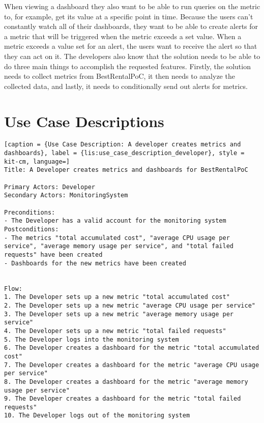 When viewing a dashboard they also want to be able to run queries on the metric to, for example, get
its value at a specific point in time.
Because the users can't constantly watch all of their dashboards, they want to be able to create
alerts for a metric that will be triggered when the metric exceeds a set value.
When a metric exceeds a value set for an alert, the users want to receive the alert so that they can act on it.
The developers also know that the solution needs to be able to do three main things to accomplish
the requested features.
Firstly, the solution needs to collect metrics from BestRentalPoC,
it then needs to analyze the collected data, and lastly, it needs to conditionally send out alerts
for metrics.

\section{Use Case Descriptions}


\vspace{0.5cm}
\begin{lstlisting}[caption = {Use Case Description: A developer creates metrics and dashboards}, label = {lis:use_case_description_developer}, style = kit-cm, language=] 
Title: A Developer creates metrics and dashboards for BestRentalPoC

Primary Actors: Developer
Secondary Actors: MonitoringSystem

Preconditions:
- The Developer has a valid account for the monitoring system
Postconditions:
- The metrics "total accumulated cost", "average CPU usage per service", "average memory usage per service", and "total failed requests" have been created
- Dashboards for the new metrics have been created


Flow:
1. The Developer sets up a new metric "total accumulated cost"
2. The Developer sets up a new metric "average CPU usage per service"
3. The Developer sets up a new metric "average memory usage per service"
4. The Developer sets up a new metric "total failed requests"
5. The Developer logs into the monitoring system
6. The Developer creates a dashboard for the metric "total accumulated cost"
7. The Developer creates a dashboard for the metric "average CPU usage per service"
8. The Developer creates a dashboard for the metric "average memory usage per service"
9. The Developer creates a dashboard for the metric "total failed requests"
10. The Developer logs out of the monitoring system

\end{lstlisting}

